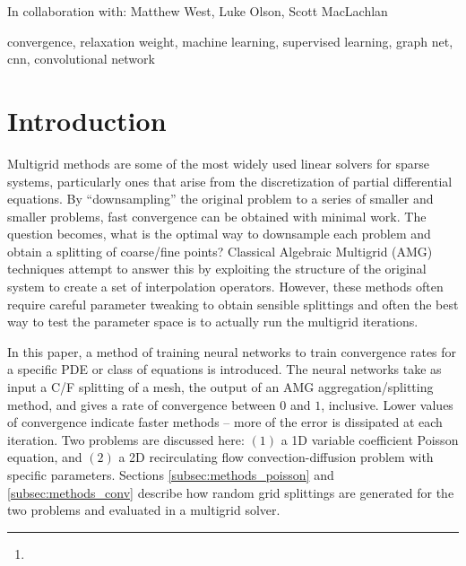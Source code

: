 \documentclass[review]{siamart190516}
\author{\TheName\thanks{\TheAddress}}
\title{{\TheTitle}}
\newcommand{\TheCollaborators}{%
  Matthew West,
  Luke Olson,
  Scott MacLachlan
}
\begin{document}
\maketitle

\begin{center}
In collaboration with:
  {\TheCollaborators}
\end{center}
\vspace{1cm}

\begin{abstract}
  
\end{abstract}

\begin{keywords}
  convergence, relaxation weight, machine learning, supervised learning, graph net, cnn, convolutional network
\end{keywords}

\section{Introduction}\label{sec:intro}

Multigrid methods are some of the most widely used linear solvers for sparse systems, particularly ones that arise from the discretization of partial differential equations.  By ``downsampling'' the original problem to a series of smaller and smaller problems, fast convergence can be obtained with minimal work.  The question becomes, what is the optimal way to downsample each problem and obtain a splitting of coarse/fine points?  Classical Algebraic Multigrid (AMG) techniques attempt to answer this by exploiting the structure of the original system to create a set of interpolation operators.  However, these methods often require careful parameter tweaking to obtain sensible splittings and often the best way to test the parameter space is to actually run the multigrid iterations.

In this paper, a method of training neural networks to train convergence rates for a specific PDE or class of equations is introduced.  The neural networks take as input a C/F splitting of a mesh, the output of an AMG aggregation/splitting method, and gives a rate of convergence between $0$ and $1$, inclusive.  Lower values of convergence indicate faster methods -- more of the error is dissipated at each iteration.  Two problems are discussed here: $(1)$ a 1D variable coefficient Poisson equation, and $(2)$ a 2D recirculating flow convection-diffusion problem with specific parameters.  Sections \ref{subsec:methods_poisson} and \ref{subsec:methods_conv} describe how random grid splittings are generated for the two problems and evaluated in a multigrid solver.
\end{document}
